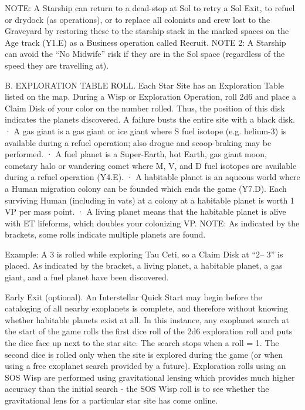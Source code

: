 \documentclass[a4paper]{book}
\begin{document}
NOTE: A Starship can return to a dead-stop at Sol to retry a Sol Exit, to refuel or drydock (as operations), or to replace all colonists and crew lost to the Graveyard by restoring these to the starship stack in the marked spaces on the Age track (Y1.E) as a Business operation called Recruit.
NOTE 2: A Starship can avoid the “No Midwife” risk if they are in the Sol space (regardless of the speed they are travelling at). 

B. EXPLORATION TABLE ROLL. Each Star Site has an Exploration Table listed on the map. During a Wisp or Exploration Operation, roll 2d6 and place a Claim Disk of your color on the number rolled. Thus, the position of this disk indicates the planets discovered. A failure busts the entire site with a black disk.
·       A gas giant is a gas giant or ice giant where S fuel isotope (e.g. helium-3) is available during a refuel operation; also drogue and scoop-braking may be performed.
·       A fuel planet is a Super-Earth, hot Earth, gas giant moon, cometary halo or wandering comet where M, V, and D fuel isotopes are available during a refuel operation (Y4.E).
·       A habitable planet is an aqueous world where a Human migration colony can be founded which ends the game (Y7.D). Each surviving Human (including in vats) at a colony at a habitable planet is worth 1 VP per mass point.
·       A living planet means that the habitable planet is alive with ET lifeforms, which doubles your colonizing VP.
NOTE: As indicated by the brackets, some rolls indicate multiple planets are found.
 
Example: A 3 is rolled while exploring Tau Ceti, so a Claim Disk at “2– 3” is placed. As indicated by the bracket, a living planet, a habitable planet, a gas giant, and a fuel planet have been discovered.

Early Exit (optional). An Interstellar Quick Start may begin before the cataloging of all nearby exoplanets is complete, and therefore without knowing whether habitable planets exist at all. In this instance, any exoplanet search at the start of the game rolls the first dice roll of the 2d6 exploration roll and puts the dice face up next to the star site. The search stops when a roll = 1. The second dice is rolled only when the site is explored during the game (or when using a free exoplanet search provided by a future). Exploration rolls using an SOS Wisp are performed using gravitational lensing which provides much higher accuracy than the initial search - the SOS Wisp roll is to see whether the gravitational lens for a particular star site has come online.
\end{document}
